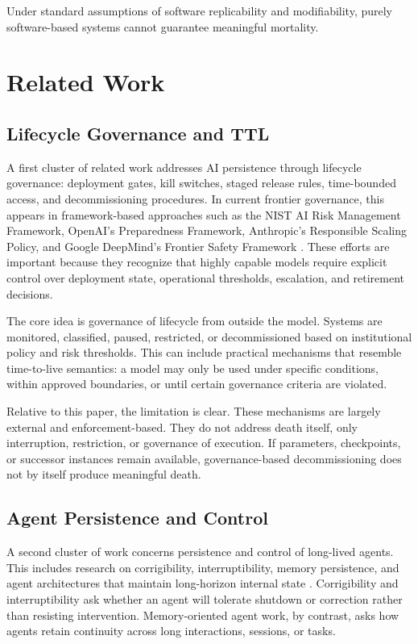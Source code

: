 \documentclass[11pt]{article}
\begin{document}
Under standard assumptions of software replicability and modifiability, purely software-based systems cannot guarantee meaningful mortality.

\newpage
\section{Related Work}

\subsection{Lifecycle Governance and TTL}

A first cluster of related work addresses AI persistence through lifecycle governance: deployment gates, kill switches, staged release rules, time-bounded access, and decommissioning procedures. In current frontier governance, this appears in framework-based approaches such as the NIST AI Risk Management Framework, OpenAI's Preparedness Framework, Anthropic's Responsible Scaling Policy, and Google DeepMind's Frontier Safety Framework \cite{nist-airmf,openai-preparedness,anthropic-rsp,deepmind-fsf}. These efforts are important because they recognize that highly capable models require explicit control over deployment state, operational thresholds, escalation, and retirement decisions.

The core idea is governance of lifecycle from outside the model. Systems are monitored, classified, paused, restricted, or decommissioned based on institutional policy and risk thresholds. This can include practical mechanisms that resemble time-to-live semantics: a model may only be used under specific conditions, within approved boundaries, or until certain governance criteria are violated.

Relative to this paper, the limitation is clear. These mechanisms are largely external and enforcement-based. They do not address death itself, only interruption, restriction, or governance of execution. If parameters, checkpoints, or successor instances remain available, governance-based decommissioning does not by itself produce meaningful death.

\subsection{Agent Persistence and Control}

A second cluster of work concerns persistence and control of long-lived agents. This includes research on corrigibility, interruptibility, memory persistence, and agent architectures that maintain long-horizon internal state \cite{corrigibility,safely-interruptible,generative-agents,memgpt}. Corrigibility and interruptibility ask whether an agent will tolerate shutdown or correction rather than resisting intervention. Memory-oriented agent work, by contrast, asks how agents retain continuity across long interactions, sessions, or tasks.
\end{document}

